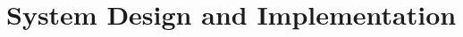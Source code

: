 \appendix
\renewcommand{\thechapter}{A}
\renewcommand{\chaptername}{Appendix}

\chapter{System Design and Implementation}
